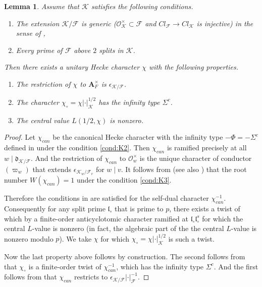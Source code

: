 \documentclass[leqno]{amsart}
\newtheorem{lem}[thm]{Lemma}
\theoremstyle{definition}
\theoremstyle{remark}
\newcommand{\oo}{\mathcal{O}}
\newcommand{\A}{\mathbf A}
\newcommand{\fl}{\mathfrak{l}}
\newcommand{\F}{{\mathcal{F}}} %
\newcommand{\K}{{\mathcal{K}}} %
\newcommand{\qch}{\epsilon} %
\begin{document}
\begin{lem}\label{lem:good_chi}
Assume that $\K$ satisfies the following conditions.
\begin{enumerate}[label=($\K$\arabic*)]
\item The extension $\K/\F$ is generic 
($\oo_\K^\times\subset \F$
and $Cl_\F\to Cl_\K$ is injective)
in the sense of \cite{Rohrlich},
\label{cond:K2}
\item Every prime of $\F$ above $2$ splits in $\K$.
\label{cond:K3}
\end{enumerate}
Then there exists a unitary Hecke character $\chi$
with the following properties.
\begin{enumerate}
\item The restriction of $\chi$ to $\A_F^\times$ is $\qch_{\K/\F}$.
\item The character $\chi_\circ=\chi|\cdot|^{1/2}_\K$
has the infinity type $\Sigma^c$.
\item The central value $L(1/2,\chi)$ is nonzero.
\end{enumerate}
\end{lem}
\begin{proof}

Let $\chi_{can}$
be the canonical Hecke character 
with the infinity type $-\Phi=-\Sigma^c$
defined in \cite{Rohrlich} 
under the condition \ref{cond:K2}.
Then $\chi_{can}$ 
is ramified precisely at all $w\mid \mathfrak{d}_{\K/\F}$.
And the restriction of $\chi_{can}$ to $\oo_w^\times$
is the unique character 
of conductor $(\varpi_w)$ 
that extends $\qch_{\K_w/\F_v}$ for $w\mid v$.
It follows from \cite[\S 8]{Rohrlich}
(see also \cite[Lem 2.1]{Rod})
that the root number $W(\chi_{can})=1$
under the condition \ref{cond:K3}.

Therefore the conditions in
\cite[Thm A]{Hsieh2012}
are satisfied for the self-dual character
$\chi_{can}^{-1}$.
Consequently for any split prime $\fl_\circ$
that is prime to $p$, there exists 
a twist of which by a finite-order 
anticyclotomic character
ramified at $\fl_\circ\fl^s_\circ$
for which the central $L$-value is nonzero
(in fact, the algebraic part of the 
the central $L$-value is nonzero modulo $p$).
We take $\chi$
for which $\chi_\circ=\chi|\cdot|^{1/2}_\K$
is such a twist.

Now the last property above follows by construction.
The second follows from that 
$\chi_\circ$ is a finite-order twist of $\chi_{can}^{-1}$,
which has the infinity type $\Sigma^c$.
And the first follows from that 
$\chi_{can}$ restricts to $\qch_{\K/\F}|\cdot|^{-1}_\F$.
\end{proof}
\end{document}
